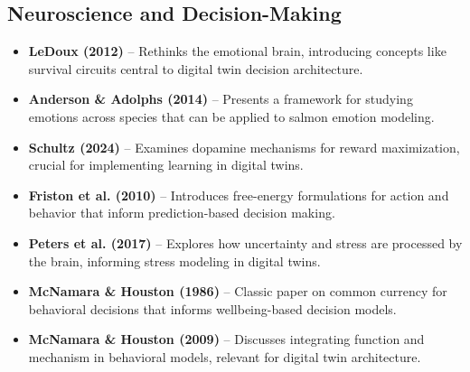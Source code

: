 \documentclass[11pt,a4paper]{article}
\begin{document}
\subsection*{Neuroscience and Decision-Making}
\begin{itemize}
    \item \textbf{LeDoux (2012)} \cite{ledoux2012rethinking} -- Rethinks the emotional brain, introducing concepts like survival circuits central to digital twin decision architecture.
    
    \item \textbf{Anderson \& Adolphs (2014)} \cite{anderson2014framework} -- Presents a framework for studying emotions across species that can be applied to salmon emotion modeling.
    
    \item \textbf{Schultz (2024)} \cite{schultz2024dopamine} -- Examines dopamine mechanisms for reward maximization, crucial for implementing learning in digital twins.
    
    \item \textbf{Friston et al. (2010)} \cite{friston2010action} -- Introduces free-energy formulations for action and behavior that inform prediction-based decision making.
    
    \item \textbf{Peters et al. (2017)} \cite{peters2017uncertainty} -- Explores how uncertainty and stress are processed by the brain, informing stress modeling in digital twins.
    
    \item \textbf{McNamara \& Houston (1986)} \cite{mcnamara1986common} -- Classic paper on common currency for behavioral decisions that informs wellbeing-based decision models.
    
    \item \textbf{McNamara \& Houston (2009)} \cite{mcnamara2009integrating} -- Discusses integrating function and mechanism in behavioral models, relevant for digital twin architecture.
\end{itemize}
\end{document}
